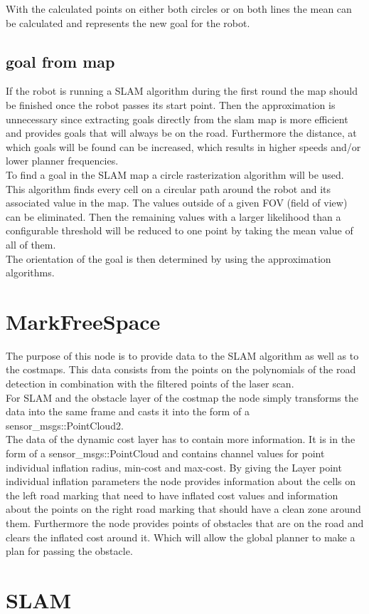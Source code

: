 With the calculated points on either both circles or on both lines the mean can be calculated and represents the new goal for the robot.



\subsection{goal from map}

If the robot is running a SLAM algorithm during the first round the map should be finished once the robot passes its start point. Then the approximation is unnecessary since extracting goals directly from the slam map is more efficient and provides goals that will  always be on the road. Furthermore the distance, at which goals will be found can be increased, which results in higher speeds and/or lower planner frequencies.\\

To find a goal in the SLAM map a circle rasterization algorithm will be used.\\

This algorithm finds every cell on a circular path around the robot and its associated value in the map. The values outside of a given FOV (field of view) can be eliminated. Then the remaining values with a larger likelihood than a configurable threshold will be reduced to one point by taking the mean value of all of them.\\

The orientation of the goal is then determined by using the approximation algorithms.


\section{MarkFreeSpace}

The purpose of this node is to provide data to the SLAM algorithm as well as to the costmaps. This data consists from the points on the polynomials of the road detection in combination with the filtered points of the laser scan.\\

For SLAM and the obstacle layer of the costmap the node simply transforms the data into the same frame and casts it into the form of a sensor\_msgs::PointCloud2.\\

The data of the dynamic cost layer has to contain more information. It is in the form of a sensor\_msgs::PointCloud and contains channel values for point individual inflation radius, min-cost and max-cost. By giving the Layer point individual inflation parameters the node provides information about the cells on the left road marking that need to have inflated cost values and information about the points on the right road marking that should have a clean zone around them. Furthermore the node provides points of obstacles that are on the road and clears the inflated cost around it. Which will allow the global planner to make a plan for passing the obstacle.

\section{SLAM}





